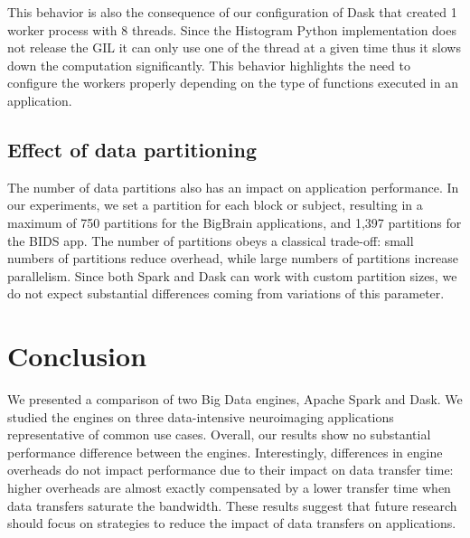 \documentclass[conference]{IEEEtran}
\begin{document}
This behavior is also the consequence of our configuration of Dask that
created 1 worker process with 8 threads. Since the Histogram Python
implementation does not release the GIL it can only use one of the thread
at a given time thus it slows down the computation significantly. This
behavior highlights the need to configure the workers properly depending on
the type of functions executed in an application.

\subsection{Effect of data partitioning}

The number of data partitions also has an impact on application
performance. In our experiments, we set a partition for each block or
subject, resulting in a maximum of 750 partitions for the BigBrain
applications, and 1,397 partitions for the BIDS app. The number of
partitions obeys a classical trade-off: small numbers of partitions reduce 
overhead, while large numbers of
partitions increase parallelism. Since both Spark and Dask can
work with custom partition sizes, we do not expect substantial differences
coming from variations of this parameter.


\section{Conclusion}
We presented a comparison of two Big Data engines, Apache Spark and Dask.
We studied the engines on three data-intensive neuroimaging applications
representative of common use cases. Overall, our results show no substantial
performance difference between the engines. Interestingly, differences in
engine overheads do not impact performance due to their impact on data
transfer time: higher overheads are almost exactly compensated by a lower
transfer time when data transfers saturate the bandwidth. These results
suggest that future research should focus on strategies to reduce the
impact of data transfers on applications.
\end{document}
